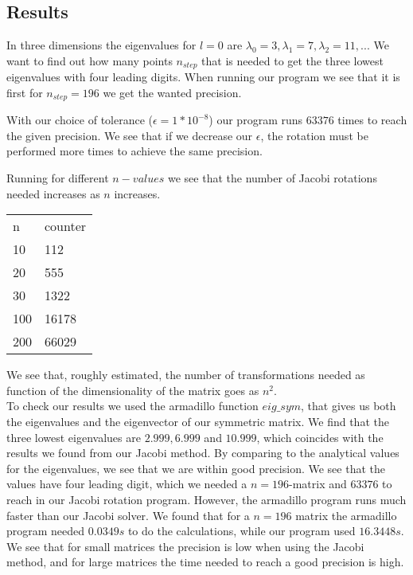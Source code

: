 \documentclass[a4paper,12pt, english]{article}
\begin{document}
\subsection{Results}
In three dimensions the eigenvalues for $l=0$ are $\lambda_0 = 3, \lambda_1 = 7, \lambda_2 = 11,...$ We want to find out how many points $n_{step}$ that is needed to get the three lowest eigenvalues with four leading digits. When running our program we see that it is first for $n_{step} = 196$ we get the wanted precision. 
 
With our choice of tolerance ($\epsilon = 1*10^{-8}$) our program runs $63376$ times to reach the given precision. We see that if we decrease our $\epsilon$, the rotation must be performed more times to achieve the same precision. 

Running for different $n-values$ we see that the number of Jacobi rotations needed increases as $n$ increases.

\begin{center}
\begin{tabular}{l |  l }
n & counter \\
10 & 112   \\
20 & 555 \\
30 & 1322 \\
100 & 16178 \\
200 & 66029 \\
\end{tabular}
\end{center}  

We see that, roughly estimated, the number of transformations needed as function of the dimensionality of the matrix goes as $n^2$. \\


To check our results we used the armadillo function $eig\_sym$, that gives us both the eigenvalues and the eigenvector of our symmetric matrix. We find that the three lowest eigenvalues are $2.999, 6.999$ and $10.999$, which coincides with the results we found from our Jacobi method. By comparing to the analytical values for the eigenvalues, we see that we are within good precision. We see that the values have four leading digit, which we needed a $n=196$-matrix and $63376$ to reach in our Jacobi rotation program. However, the armadillo program runs much faster than our Jacobi solver. We found that for a $n=196$ matrix the armadillo program needed $0.0349 s$ to do the calculations, while our program used $16.3448 s$. We see that for small matrices the precision is low when using the Jacobi method, and for large matrices the time needed to reach a good precision is high. \\
\end{document}
